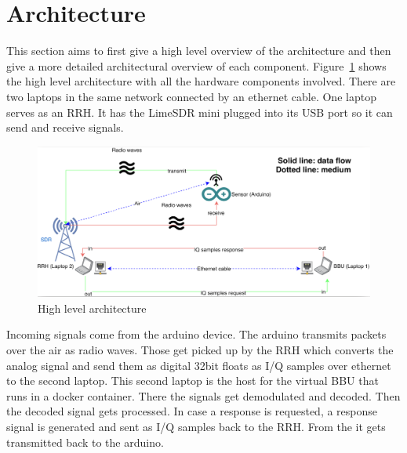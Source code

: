 \section{Architecture}
This section aims to first give a high level overview of the architecture and then give a more detailed 
architectural overview of each component.
Figure~\ref{fig:high_level_arch} shows the high level architecture with all the hardware components involved.
There are two laptops in the same network connected by an ethernet cable. One laptop serves as an RRH. It has the LimeSDR mini 
plugged into its USB port so it can send and receive signals.
\begin{figure}[h]
    \centering
    \includegraphics[width=1\textwidth]{figures/high_level_arch.png}
    \caption{High level architecture}
    \label{fig:high_level_arch}
\end{figure}
Incoming signals come from the arduino device. The arduino transmits packets over the air as radio waves. Those get picked up 
by the RRH which converts the analog signal and send them as digital 32bit floats as I/Q samples over ethernet to the second laptop.
This second laptop is the host for the virtual BBU that runs in a docker container. There the signals get demodulated and decoded.
Then the decoded signal gets processed. In case a response is requested, a response signal is generated and sent as I/Q samples back to the RRH.
From the it gets transmitted back to the arduino.
